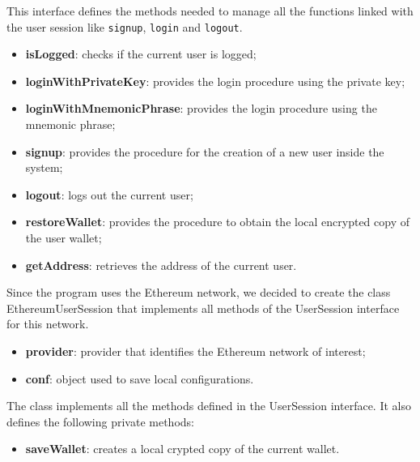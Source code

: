 			This interface defines the methods needed to manage all the functions linked with the user session like \texttt{signup}, \texttt{login} and \texttt{logout}.
				\begin{itemize}
					\item \textbf{isLogged}: checks if the current user is logged;
					\item \textbf{loginWithPrivateKey}: provides the login procedure using the private key;
					\item \textbf{loginWithMnemonicPhrase}: provides the login procedure using the mnemonic phrase;
					\item \textbf{signup}: provides the procedure for the creation of a new user inside the system;
					\item \textbf{logout}: logs out the current user;
					\item \textbf{restoreWallet}: provides the procedure to obtain the local encrypted copy of the user wallet;
					\item \textbf{getAddress}: retrieves the address of the current user.
				\end{itemize}
			
			Since the program uses the Ethereum network, we decided to create the class EthereumUserSession that implements all methods of the UserSession interface for this network.
					\begin{itemize}
						\item \textbf{provider}: provider that identifies the Ethereum network of interest; 
						\item \textbf{conf}: object used to save local configurations.
					\end{itemize}
				
				The class implements all the methods defined in the UserSession interface. It also defines the following private methods: 
					\begin{itemize}
						\item\textbf{saveWallet}: creates a local crypted copy of the current wallet. 
					\end{itemize}
				
